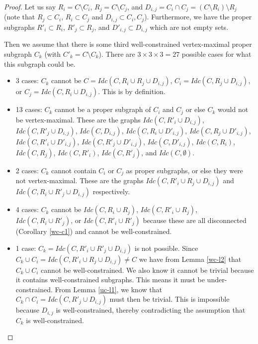 \begin{proof}
Let us say $R_i=C\setminus C_i$, $R_j=C\setminus C_j$, and $D_{i,j}=C_i\cap C_j=(C\setminus R_i)\setminus R_j$ (note that $R_j\subset C_i$, $R_i\subset C_j$ and $D_{i,j}\subset C_i,C_j$). Furthermore, we have the proper subgraphs $R'_i\subset R_i$, $R'_j\subset R_j$, and $D'_{i,j}\subset D_{i,j}$ which are not empty sets.

Then we assume that there is some third well-constrained vertex-maximal proper subgraph $C_k$ (with $C'_k=C\setminus C_k$). There are $3\times 3\times 3 = 27$ possible cases for what this subgraph could be.

\begin{itemize}
    \item 3 cases: $C_k$ cannot be $C=Idc(C,R_i\cup R_j\cup D_{i,j})$, $C_i=Idc(C,R_j\cup D_{i,j})$, or $C_j=Idc(C,R_i\cup D_{i,j})$. This is by definition.

    \item 13 cases: $C_k$ cannot be a proper subgraph of $C_i$ and $C_j$ or else $C_k$ would not be vertex-maximal. These are the graphs $Idc(C,R'_i\cup D_{i,j})$, $Idc(C,R'_j\cup D_{i,j})$, $Idc(C, D_{i,j})$, $Idc(C,R_i\cup D'_{i,j})$, $Idc(C,R_j\cup D'_{i,j})$, $Idc(C,R'_i\cup D'_{i,j})$, $Idc(C,R'_j\cup D'_{i,j})$, $Idc(C, D'_{i,j})$, $Idc(C,R_i)$, $Idc(C,R_j)$, $Idc(C,R'_i)$, $Idc(C,R'_j)$, and $Idc(C,\emptyset)$.

    \item 2 cases: $C_k$ cannot contain $C_i$ or $C_j$ as proper subgraphs, or else they were not vertex-maximal. These are the graphs $Idc(C,R'_i\cup R_j\cup D_{i,j})$ and $Idc(C,R_i\cup R'_j\cup D_{i,j})$ respectively.

    \item 4 cases:  $C_k$ cannot be $Idc(C,R_i\cup R_j)$, $Idc(C,R'_i\cup R_j)$, $Idc(C,R_i\cup R'_j)$, or $Idc(C,R'_i\cup R'_j)$ because these are all disconnected (Corollary \ref{wc-c1}) and cannot be well-constrained.

    \item 1 case: $C_k=Idc(C,R'_i\cup R'_j\cup D_{i,j})$ is not possible. Since $C_k\cup C_i = Idc(C,R'_i\cup R_j\cup D_{i,j})\neq C$ we have from Lemma \ref{wc-l2} that $C_k\cup C_i$ cannot be well-constrained. We also know it cannot be trivial because it contains well-constrained subgraphs. This means it must be under-constrained. From Lemma \ref{uc-l1}, we know that $C_k\cap C_i=Idc(C,R'_j\cup D_{i,j})$ must then be trivial. This is impossible because $D_{i,j}$ is well-constrained, thereby contradicting the assumption that $C_k$ is well-constrained.


\end{itemize}
\end{proof}
